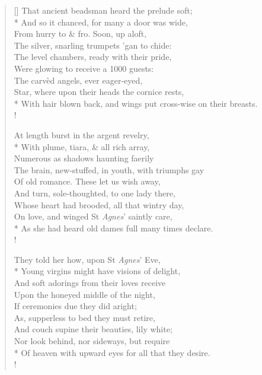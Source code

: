 \documentclass[MAIN]{subfiles}
\begin{document}
\begin{verse}[\versewidth]
\vin That ancient beadsman heard the prelude soft;\\*
\vin And so it chanced, for many a door was wide,\\
\vin From hurry to \& fro. Soon, up aloft,\\
\vin The silver, snarling trumpets 'gan to chide:\\
\vin The level chambers, ready with their pride,\\
\vin Were glowing to receive a 1000 guests:\\
\vin The carv\`ed angels, ever eager-eyed,\\
\vin Star, where upon their heads the cornice rests,\\*
With hair blown back, and wings put cross-wise on their breasts.\\!

\vin At length burst in the argent revelry,\\*
\vin With plume, tiara, \& all rich array,\\
\vin Numerous as shadows haunting faerily\\
\vin The brain, new-stuffed, in youth, with triumphs gay\\
\vin Of old romance. These let us wish away,\\
\vin And turn, sole-thoughted, to one lady there,\\
\vin Whose heart had brooded, all that wintry day,\\
\vin On love, and winged St \emph{Agnes}' saintly care,\\*
As she had heard old dames full many times declare.\\!

\vin They told her how, upon St \emph{Agnes}' Eve,\\*
\vin Young virgins might have visions of delight,\\
\vin And soft adorings from their loves receive\\
\vin Upon the honeyed middle of the night,\\
\vin If ceremonies due they did aright;\\
\vin As, supperless to bed they must retire,\\
\vin And couch supine their beauties, lily white;\\
\vin Nor look behind, nor sideways, but require\\*
Of heaven with upward eyes for all that they desire.\\!


\end{verse}
\end{document}
